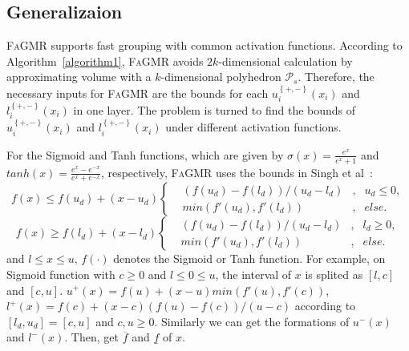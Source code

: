 \documentclass[runningheads]{llncs}
\newcommand{\ourtool}{\textsc{FaGMR}\xspace}
\begin{document}
\subsection{Generalizaion}
\ourtool supports fast grouping with common activation functions. 
According to Algorithm~\ref{algorithm1}, 
\ourtool avoids $2k$-dimensional calculation 
by approximating volume with a $k$-dimensional polyhedron $\mathcal{P}_{s}$. 
Therefore, the necessary inputs for \ourtool are the 
bounds for each $u^{\left\{+,- \right\}}_{i}(x_{i})$ and 
$l^{\left\{+,- \right\}}_{i}(x_{i})$ in one layer. 
The problem is turned to find the bounds of 
$u^{\left\{+,- \right\}}_{i}(x_{i})$ and 
$l^{\left\{+,- \right\}}_{i}(x_{i})$ under different activation functions.

For the Sigmoid and Tanh functions, which are given by $\sigma(x)=\frac{e^{x}}{e^{x}+1}$ 
and $tanh(x)=\frac{e^{x}-e^{-x}}{e^{x}+e^{-x}}$, respectively, 
\ourtool uses the bounds in Singh et al~\cite{NEURIPS2018_f2f44698}:
\begin{equation*}
f(x) \leq f(u_{d}) + (x - u_{d})\left\{
\begin{aligned}
&(f(u_{d}) - f(l_{d}))/(u_{d} - l_{d}) & , & u_{d} \leq 0, \\
&min(f'(u_{d}), f'(l_{d})) & , & else.
\end{aligned}
\right.
\end{equation*}
\begin{equation*}
f(x) \geq f(l_{d}) + (x - l_{d})\left\{
\begin{aligned}
&(f(u_{d}) - f(l_{d}))/(u_{d} - l_{d}) & , & l_{d} \geq 0, \\
&min(f'(u_{d}), f'(l_{d})) & , & else.
\end{aligned}
\right.
\end{equation*}
and $l\leq x \leq u$, 
$f(\cdot)$ denotes the Sigmoid or Tanh function. 
For example, on Sigmoid function with $c \geq 0$ and $l \leq 0 \leq u$, the interval of $x$ 
is splited as $[l,c]$ and $[c, u]$. $u^{+}(x) = f(u)+(x-u)min(f'(u),f'(c))$, 
$l^{+}(x) = f(c) + (x-c)(f(u)-f(c))/(u-c)$ 
according to $[l_{d},u_{d}]=[c,u]$ and $c,u \geq 0$. 
Similarly we can get the formations of $u^{-}(x)$ and $l^{-}(x)$. 
Then, get $\overline{f}$ and $\underline{f}$ of $x$. 
\end{document}
